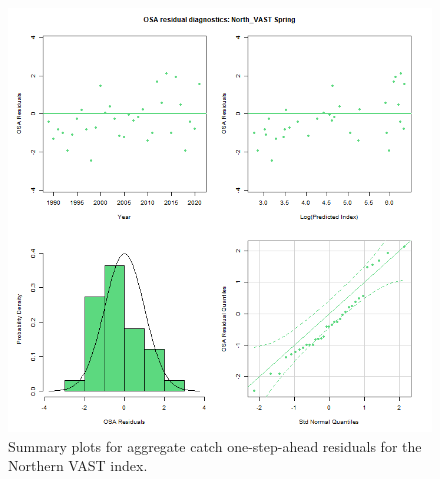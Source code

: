 \documentclass[
]{article}
\begin{document}
\begin{figure}

{\centering \includegraphics[width=1\linewidth]{../2023.RT.Runs/Run34/plots_png/diagnostics/OSA_resid_catch_4panel_North_VAST_Spring} 

}

\caption{Summary plots for aggregate catch one-step-ahead residuals for the Northern VAST index.}\label{fig:osa-North-vast-catch-summ}
\end{figure}
\end{document}
